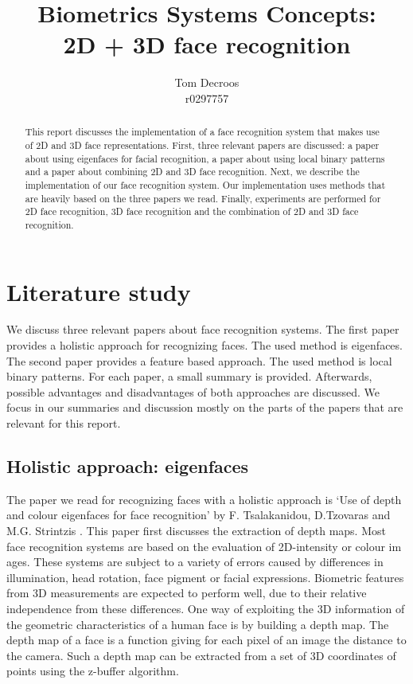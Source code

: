 \documentclass[]{article}
\title{Biometrics Systems Concepts:\\ 2D + 3D face recognition}
\author{Tom Decroos\\r0297757}
\begin{document}
\maketitle
\begin{abstract}
This report discusses the implementation of a face recognition system that makes use of 2D and 3D face representations. First, three relevant papers are discussed: a paper about using eigenfaces for facial recognition, a paper about using local binary patterns and a paper about combining 2D and 3D face recognition. Next, we describe the implementation of our face recognition system. Our implementation uses methods that are heavily based on the three papers we read. Finally, experiments are performed for 2D face recognition, 3D face recognition and the combination of 2D and 3D face recognition.
\end{abstract}

\section{Literature study}
We discuss three relevant papers about face recognition systems. The first paper provides a holistic approach for recognizing faces. The used method is eigenfaces. The second paper provides a feature based approach. The used method is local binary patterns.
For each paper, a small summary is provided. Afterwards, possible advantages and disadvantages of both approaches are discussed. We focus in our summaries and discussion mostly on the parts of the papers that are relevant for this report.

\subsection{Holistic approach: eigenfaces}
The paper we read for recognizing faces with a holistic approach is `Use of depth and colour eigenfaces for face recognition' by F. Tsalakanidou, D.Tzovaras and M.G. Strintzis \cite{tsalakanidou2003use}.
This paper first discusses the extraction of depth maps. Most face recognition systems are based on the evaluation of 2D-intensity or colour im ages. These systems are subject to a variety of errors caused by differences in illumination, head rotation, face pigment or facial expressions. Biometric features from 3D measurements are expected to perform well, due to their relative independence from these differences. One way of exploiting the 3D information of the geometric characteristics of a human face is by building a depth map. The depth map of a face is a function giving for each pixel of an image the distance to the camera. Such a depth map can be extracted from a set of 3D coordinates of points using the z-buffer algorithm.
\end{document}

